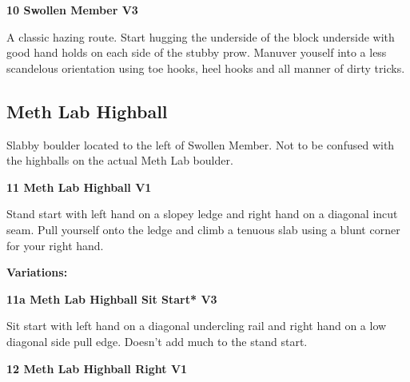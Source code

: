 \begin{multicols}{2}
\needspace{1.5cm}
\label{rt:Swollen Member}
\colorbox{green!20}{
\parbox{0.95\linewidth}{
\textbf{
10 Swollen Member V3  
}}}

\begin{adjustwidth}{0.5cm}{}			
A classic hazing route. Start hugging the underside of the block underside with good hand holds on each side of the stubby prow. Manuver youself into a less scandelous orientation using toe hooks, heel hooks and  all manner of dirty tricks.
\end{adjustwidth}




\needspace{1.5cm}
\subsection*{Meth Lab Highball}\label{bf:Meth Lab Highball}
Slabby boulder located to the left of Swollen Member. Not to be confused with the highballs on the actual Meth Lab boulder.\\
	


\needspace{1.5cm}
\label{rt:Meth Lab Highball}
\colorbox{green!20}{
\parbox{0.95\linewidth}{
\textbf{
11 Meth Lab Highball V1  \warn
}}}

\begin{adjustwidth}{0.5cm}{}			
Stand start with left hand on a slopey ledge and right hand on a diagonal incut seam. Pull yourself onto the ledge and climb a tenuous slab using a blunt corner for your right hand.
\end{adjustwidth}

\begin{adjustwidth}{0.5cm}{}				
\needspace{3cm}
\textbf{Variations:} \newline

\needspace{1.5cm}
\label{vr:Meth Lab Highball Sit Start}
\colorbox{green!20}{
\parbox{0.95\linewidth}{
\textbf{
11a Meth Lab Highball Sit Start* V3  
}}}

\begin{adjustwidth}{0.5cm}{}			
Sit start with left hand on a diagonal undercling rail and right hand on a low diagonal side pull edge. Doesn't add much to the stand start.
\end{adjustwidth}


\end{adjustwidth}


\needspace{1.5cm}
\label{rt:Meth Lab Highball Right}
\colorbox{green!20}{
\parbox{0.95\linewidth}{
\textbf{
12 Meth Lab Highball Right V1  
}}}


\end{multicols}
